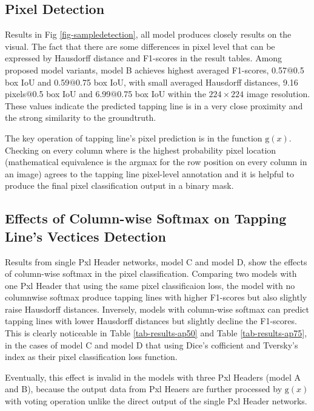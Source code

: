 \documentclass[default,pdflatex,iicol]{sn-jnl}%
\begin{document}
\subsection{Pixel Detection}
Results in Fig \ref{fig-sampledetection}, all model produces closely results on the visual. The fact that there are some differences in pixel level that can be expressed by Hausdorff distance and F1-scores in the result tables. Among proposed model variants, model B achieves highest averaged F1-scores, 0.57$@$0.5 box IoU and 0.59$@$0.75 box IoU, with small averaged Hausdorff distances, 9.16 pixels$@$0.5 box IoU and 6.99$@$0.75 box IoU within the $224 \times 224$ image resolution. These values indicate the predicted tapping line is in a very close proximity and the strong similarity to the groundtruth.

The key operation of tapping line's pixel prediction is in the function $\mathrm{g}(x)$. Checking on every column where is the highest probability pixel location (mathematical equivalence is the argmax for the row position on every column in an image) agrees to the tapping line pixel-level annotation and it is helpful to produce the final pixel classification output in a binary mask. 

\subsection{Effects of Column-wise Softmax on Tapping Line's Vectices Detection}
Results from single Pxl Header networks, model C and model D, show the effects of column-wise softmax in the pixel classification. Comparing two models with one Pxl Header that using the same pixel classificaion loss, the model with no columnwise softmax produce tapping lines with higher F1-scores but also slightly raise Hausdorff distances. Inversely, models with column-wise softmax can predict tapping lines with lower Hausdorff distances but slightly decline the F1-scores. This is clearly noticeable in Table \ref{tab-results-ap50} and Table \ref{tab-results-ap75}, in the cases of model C and model D that using Dice's cofficient and Tversky's index as their pixel classification loss function.

Eventually, this effect is invalid in the models with three Pxl Headers (model A and B), because the output data from Pxl Heaers are further processed by $\mathrm{g}(x)$ with voting operation unlike the direct output of the single Pxl Header networks.
\end{document}
